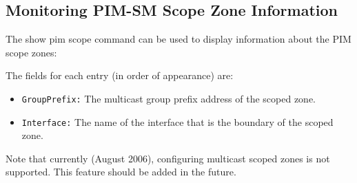 \subsection{Monitoring PIM-SM Scope Zone Information}

The {\stt show pim scope} command can be used to display
information about the PIM scope zones:

\vspace{0.1in}
\noindent{}
\vspace{0.1in}

The fields for each entry (in order of appearance) are:
\begin{itemize}

  \item {\tt GroupPrefix:} The multicast group prefix address of the scoped
  zone.

  \item {\tt Interface:} The name of the interface that is the boundary
  of the scoped zone.

\end{itemize}

Note that currently (August 2006), configuring multicast scoped zones is not
supported. This feature should be added in the future.
